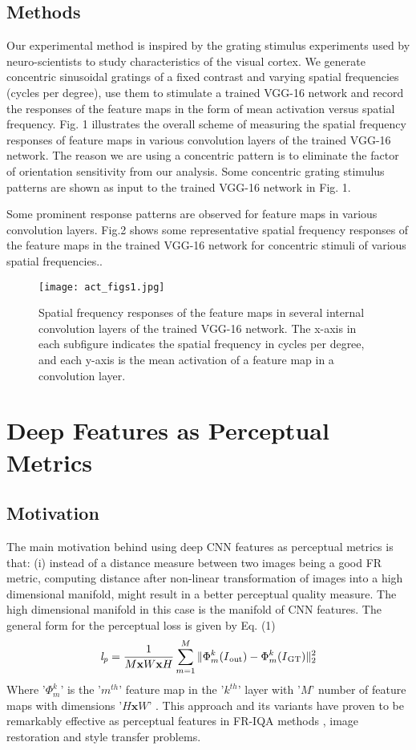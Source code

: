 \documentclass[10pt,twocolumn,letterpaper]{article}
\begin{document}
\subsection{Methods}
Our experimental method is inspired by the grating stimulus experiments used by neuro-scientists to study characteristics of the visual cortex. We generate concentric sinusoidal gratings of a fixed contrast and varying spatial frequencies (cycles per degree), use them to stimulate a trained VGG-16 \cite{30} network and record the responses of the feature maps in the form of mean activation versus spatial frequency. Fig. 1 illustrates the overall scheme of measuring the spatial frequency responses of feature maps in various convolution layers of the trained VGG-16 network. The reason we are using a concentric pattern is to eliminate the factor of orientation sensitivity from our analysis. Some concentric grating stimulus patterns are shown as input to the trained VGG-16 network in Fig. 1.

    Some prominent response patterns are observed for feature maps in various convolution layers. Fig.2 shows some representative spatial frequency responses of the feature maps in the trained VGG-16 network for concentric stimuli of various spatial frequencies..

\begin{figure}[t!]
\texttt{[image: act\_figs1.jpg]}
\caption{Spatial frequency responses of the feature maps in several internal convolution layers of the trained VGG-16 network. The x-axis in each subfigure indicates the spatial frequency in cycles per degree, and each y-axis is the mean activation of a feature map in a convolution layer.}
\label{fig:Spike_Sorting}
\end{figure}

\section{Deep Features as Perceptual Metrics}
\subsection{Motivation}
The main motivation behind using deep CNN features as perceptual metrics is that: (i) instead of a distance measure between two images being a good FR metric, computing distance after non-linear transformation of images into a high dimensional manifold, might result in a better perceptual quality measure. The high dimensional manifold in this case is the manifold of CNN features. The general form for the perceptual loss \cite{7} is given by Eq. (1)
\begin{equation}
\mathit{l_p}=\frac{1}{M\mathbf{x} W\mathbf{x} H}\sum\limits_{m=1}^M\Vert\Phi^k_m(I\textsubscript{out})-\Phi^k_m(I\textsubscript{GT})\Vert_2^2
\end{equation}
Where '$\Phi^k_m$' is the '$\textit{m}^{th}$' feature map in the '$\textit{k}^{th}$' layer with '$\textit{M}$' number of feature maps with dimensions '$\textit{H$\mathbf{x}$W}$' . This approach and its variants have proven to be remarkably effective as perceptual features in FR-IQA methods \cite{25}, image restoration \cite{10} and style transfer \cite{11} problems.
\end{document}
